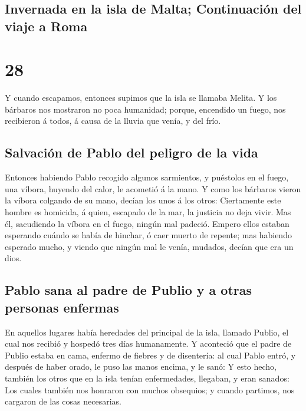 \hypertarget{invernada-en-la-isla-de-malta-continuaciuxf3n-del-viaje-a-roma}{%
\subsection{Invernada en la isla de Malta; Continuación del viaje a
Roma}\label{invernada-en-la-isla-de-malta-continuaciuxf3n-del-viaje-a-roma}}

\hypertarget{section-27}{%
\section{28}\label{section-27}}

 Y cuando escapamos, entonces supimos que la isla se llamaba
Melita.  Y los bárbaros nos mostraron no poca humanidad;
porque, encendido un fuego, nos recibieron á todos, á causa de la lluvia
que venía, y del frío.

\hypertarget{salvaciuxf3n-de-pablo-del-peligro-de-la-vida}{%
\subsection{Salvación de Pablo del peligro de la
vida}\label{salvaciuxf3n-de-pablo-del-peligro-de-la-vida}}

 Entonces habiendo Pablo recogido algunos sarmientos, y
puéstolos en el fuego, una víbora, huyendo del calor, le acometió á la
mano.  Y como los bárbaros vieron la víbora colgando de su
mano, decían los unos á los otros: Ciertamente este hombre es homicida,
á quien, escapado de la mar, la justicia no deja vivir.  Mas
él, sacudiendo la víbora en el fuego, ningún mal padeció. 
Empero ellos estaban esperando cuándo se había de hinchar, ó caer muerto
de repente; mas habiendo esperado mucho, y viendo que ningún mal le
venía, mudados, decían que era un dios.

\hypertarget{pablo-sana-al-padre-de-publio-y-a-otras-personas-enfermas}{%
\subsection{Pablo sana al padre de Publio y a otras personas
enfermas}\label{pablo-sana-al-padre-de-publio-y-a-otras-personas-enfermas}}

 En aquellos lugares había heredades del principal de la
isla, llamado Publio, el cual nos recibió y hospedó tres días
humanamente.  Y aconteció que el padre de Publio estaba en
cama, enfermo de fiebres y de disentería: al cual Pablo entró, y después
de haber orado, le puso las manos encima, y le sanó:  Y esto
hecho, también los otros que en la isla tenían enfermedades, llegaban, y
eran sanados:  Los cuales también nos honraron con muchos
obsequios; y cuando partimos, nos cargaron de las cosas necesarias.

